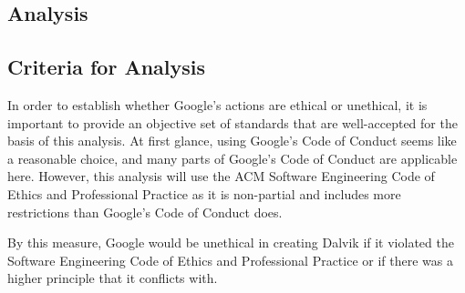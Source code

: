 \documentclass[11pt]{article}
\begin{document}
\begin{multicols}{2}


\section{Analysis} %
\label{sec:analysis}

%
%
%
%

\subsection{Criteria for Analysis} %
\label{sub:criteria}

In order to establish whether Google's actions are ethical or unethical, it is
important to provide an objective set of standards that are well-accepted for
the basis of this analysis.  At first glance, using Google's Code of Conduct
\cite{google-conduct} seems like a reasonable choice, and many parts of Google's
Code of Conduct are applicable here.  However, this analysis will use the ACM
Software Engineering Code of Ethics and Professional Practice \cite{secode} as
it is non-partial and includes more restrictions than Google's Code of Conduct
does.

By this measure, Google would be unethical in creating Dalvik if it violated the
Software Engineering Code of Ethics and Professional Practice \cite{secode} or
if there was a higher principle that it conflicts with.


\end{multicols}
\end{document}
